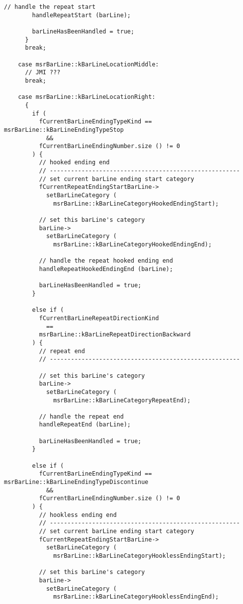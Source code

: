 \begin{lstlisting}[language=CPlusPlus]
        // handle the repeat start
        handleRepeatStart (barLine);

        barLineHasBeenHandled = true;
      }
      break;

    case msrBarLine::kBarLineLocationMiddle:
      // JMI ???
      break;

    case msrBarLine::kBarLineLocationRight:
      {
        if (
          fCurrentBarLineEndingTypeKind == msrBarLine::kBarLineEndingTypeStop
            &&
          fCurrentBarLineEndingNumber.size () != 0
        ) {
          // hooked ending end
          // ------------------------------------------------------
          // set current barLine ending start category
          fCurrentRepeatEndingStartBarLine->
            setBarLineCategory (
              msrBarLine::kBarLineCategoryHookedEndingStart);

          // set this barLine's category
          barLine->
            setBarLineCategory (
              msrBarLine::kBarLineCategoryHookedEndingEnd);

          // handle the repeat hooked ending end
          handleRepeatHookedEndingEnd (barLine);

          barLineHasBeenHandled = true;
        }

        else if (
          fCurrentBarLineRepeatDirectionKind
            ==
          msrBarLine::kBarLineRepeatDirectionBackward
        ) {
          // repeat end
          // ------------------------------------------------------

          // set this barLine's category
          barLine->
            setBarLineCategory (
              msrBarLine::kBarLineCategoryRepeatEnd);

          // handle the repeat end
          handleRepeatEnd (barLine);

          barLineHasBeenHandled = true;
        }

        else if (
          fCurrentBarLineEndingTypeKind == msrBarLine::kBarLineEndingTypeDiscontinue
            &&
          fCurrentBarLineEndingNumber.size () != 0
        ) {
          // hookless ending end
          // ------------------------------------------------------
          // set current barLine ending start category
          fCurrentRepeatEndingStartBarLine->
            setBarLineCategory (
              msrBarLine::kBarLineCategoryHooklessEndingStart);

          // set this barLine's category
          barLine->
            setBarLineCategory (
              msrBarLine::kBarLineCategoryHooklessEndingEnd);


\end{lstlisting}
